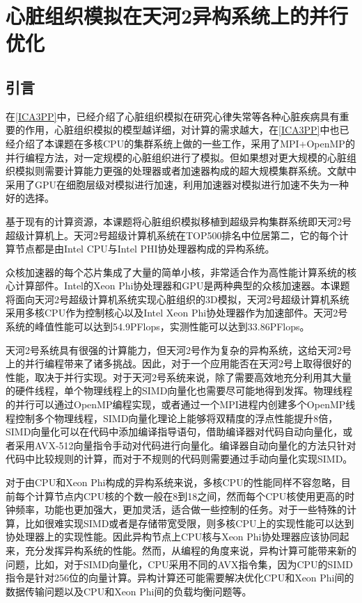
\chapter{心脏组织模拟在天河2异构系统上的并行优化}
\label{icpads}

\section{引言}
在\ref{ICA3PP}中，已经介绍了心脏组织模拟在研究心律失常等各种心脏疾病具有重要的作用，心脏组织模拟的模型越详细，对计算的需求越大，在\ref{ICA3PP}中也已经介绍了本课题在多核CPU的集群系统上做的一些工作，采用了MPI+OpenMP的并行编程方法，对一定规模的心脏组织进行了模拟。但如果想对更大规模的心脏组织模拟则需要计算能力更强的处理器或者加速器构成的超大规模集群系统。文献中采用了GPU在细胞层级对模拟进行加速，利用加速器对模拟进行加速不失为一种好的选择。

基于现有的计算资源，本课题将心脏组织模拟移植到超级异构集群系统即天河2号超级计算机上。天河2号超级计算机系统在TOP500排名中位居第二，它的每个计算节点都是由Intel CPU与Intel PHI协处理器构成的异构系统。

众核加速器的每个芯片集成了大量的简单小核，非常适合作为高性能计算系统的核心计算部件。Intel的Xeon Phi协处理器和GPU是两种典型的众核加速器。本课题将面向天河2号超级计算机系统实现心脏组织的3D模拟，天河2号超级计算机系统采用多核CPU作为控制核心以及Intel Xeon Phi协处理器作为加速部件。天河2号系统的峰值性能可以达到54.9PFlops，实测性能可以达到33.86PFlops。

天河2号系统具有很强的计算能力，但天河2号作为复杂的异构系统，这给天河2号上的并行编程带来了诸多挑战。因此，对于一个应用能否在天河2号上取得很好的性能，取决于并行实现。对于天河2号系统来说，除了需要高效地充分利用其大量的硬件线程，单个物理线程上的SIMD向量化也需要尽可能地得到发挥。物理线程的并行可以通过OpenMP编程实现，或者通过一个MPI进程内创建多个OpenMP线程控制多个物理线程，SIMD向量化理论上能够将双精度的浮点性能提升8倍，SIMD向量化可以在代码中添加编译指导语句，借助编译器对代码自动向量化，或者采用AVX-512向量指令手动对代码进行向量化。编译器自动向量化的方法只针对代码中比较规则的计算，而对于不规则的代码则需要通过手动向量化实现SIMD。

对于由CPU和Xeon Phi构成的异构系统来说，多核CPU的性能同样不容忽略，目前每个计算节点内CPU核的个数一般在8到18之间，然而每个CPU核使用更高的时钟频率，功能也更加强大，更加灵活，适合做一些控制的任务。对于一些特殊的计算，比如很难实现SIMD或者是存储带宽受限，则多核CPU上的实现性能可以达到协处理器上的实现性能。因此异构节点上CPU核与Xeon Phi协处理器应该协同起来，充分发挥异构系统的性能。然而，从编程的角度来说，异构计算可能带来新的问题，比如，对于SIMD向量化，CPU采用不同的AVX指令集，因为CPU的SIMD指令是针对256位的向量计算。异构计算还可能需要解决优化CPU和Xeon Phi间的数据传输问题以及CPU和Xeon Phi间的负载均衡问题等。

